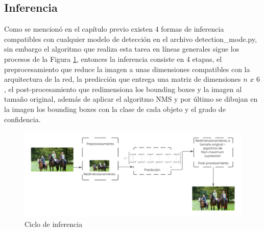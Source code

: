 \subsection{Inferencia}
Como se mencionó en el capítulo previo existen 4 formas de inferencia compatibles con cualquier modelo de detección en el archivo detection\_mode.py, sin embargo el algoritmo que realiza esta tarea en líneas generales sigue los procesos de la Figura \ref{inference_diagram}, entonces la inferencia consiste en 4 etapas, el preprocesamiento que reduce la imagen a unas dimensiones compatibles con la arquitectura de la red, la predicción que entrega una matriz de dimensiones $n$ $x$ $6$, el post-procesamiento que redimensiona los bounding boxes y la imagen al tamaño original, además de aplicar el algoritmo NMS y por último se dibujan en la imagen los bounding boxes con la clase de cada objeto y el grado de confidencia.
\begin{figure}[H]
    \centering
    \includegraphics[scale=0.6]{Recursos/inference_cycle.png}
    \caption{Ciclo de inferencia}
    \label{inference_diagram}
\end{figure}
